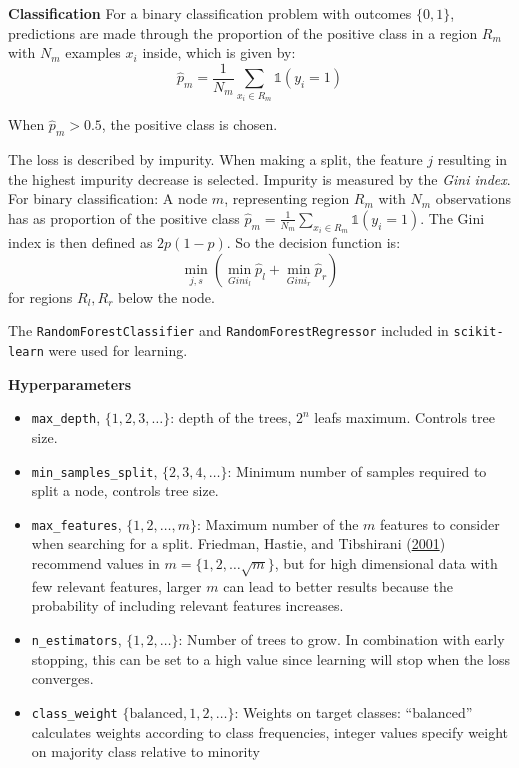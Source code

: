 \documentclass[
  11pt,
  a4paper,
  DIV=12,captions=tableheading,oneside,titlepage]{scrbook}
\providecommand{\tightlist}{%
  \setlength{\itemsep}{0pt}\setlength{\parskip}{0pt}}
\begin{document}
\textbf{Classification} For a binary classification problem with outcomes \(\{0,1\}\), predictions are made through the proportion of the positive class in a region \(R_m\) with \(N_m\) examples \(x_i\) inside, which is given by: \begin{equation}
\hat{p}_m = \frac{1}{N_m} \sum_{x_i \in R_m} \mathbb{1}(y_i = 1)
\label{eq:cart-class}
\end{equation}

When \(\hat{p}_m>0.5\), the positive class is chosen.

The loss is described by impurity. When making a split, the feature \(j\) resulting in the highest impurity decrease is selected. Impurity is measured by the \emph{Gini index}. For binary classification: A node \(m\), representing region \(R_m\) with \(N_m\) observations has as proportion of the positive class \(\hat{p}_m = \frac{1}{N_m} \sum_{x_i \in R_m} \mathbb{1}(y_i = 1)\). The Gini index is then defined as \(2p(1-p)\). So the decision function is: \begin{equation}
\min_{j,s}(\min_{Gini_l} \hat{p}_l + \min_{Gini_r} \hat{p}_r)
\label{eq:cart-class-dec}
\end{equation} for regions \(R_l, R_r\) below the node.

The \texttt{RandomForestClassifier} and \texttt{RandomForestRegressor} included in \texttt{scikit-learn} were used for learning.

\textbf{Hyperparameters}

\begin{itemize}
\tightlist
\item
  \texttt{max\_depth}, \(\{1,2,3, \ldots\}\): depth of the trees, \(2^n\) leafs maximum. Controls tree size.
\item
  \texttt{min\_samples\_split}, \(\{2,3,4,\ldots\}\): Minimum number of samples required to split a node, controls tree size.
\item
  \texttt{max\_features}, \(\{1, 2, \ldots, m\}\): Maximum number of the \(m\) features to consider when searching for a split. Friedman, Hastie, and Tibshirani (\protect\hyperlink{ref-friedman2001elements}{2001}) recommend values in \(m = \{1, 2, \ldots \sqrt{m}\}\), but for high dimensional data with few relevant features, larger \(m\) can lead to better results because the probability of including relevant features increases.
\item
  \texttt{n\_estimators}, \(\{1, 2, \ldots\}\): Number of trees to grow. In combination with early stopping, this can be set to a high value since learning will stop when the loss converges.
\item
  \texttt{class\_weight} \(\{\text{balanced}, 1,2,\ldots\}\): Weights on target classes: ``balanced'' calculates weights according to class frequencies, integer values specify weight on majority class relative to minority
\end{itemize}
\end{document}
